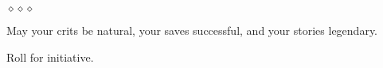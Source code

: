 \documentclass[11pt,letterpaper,openany]{book}
\begin{document}
\begin{center}
$\diamond \diamond \diamond$
\end{center}

May your crits be natural, your saves successful, and your stories legendary.

Roll for initiative.

\vfill

\begin{center}
\end{center}
\end{document}
